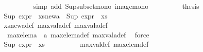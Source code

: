 \begin{isabellebody}
\ \ \ \ \ \ \ \ \isamarkupfalse%
\ {\isacharparenleft}{\kern0pt}simp\ add{\isacharcolon}{\kern0pt}\ Sup{\isacharunderscore}{\kern0pt}subset{\isacharunderscore}{\kern0pt}mono\ image{\isacharunderscore}{\kern0pt}mono{\isacharparenright}{\kern0pt}\isanewline
\ \ \ \ \ \ \isamarkupfalse%
\ \isamarkupfalse%
\ {\isacharquery}{\kern0pt}thesis\ \isamarkupfalse%
\ {\isacartoucheopen}Sup\ {\isacharparenleft}{\kern0pt}expr{\isacharunderscore}{\kern0pt}{}\ {\isacharbackquote}{\kern0pt}\ xs{\isacharunderscore}{\kern0pt}new{\isacharunderscore}{\kern0pt}a{\isacharparenright}{\kern0pt}\ {\isasymge}\ Sup\ {\isacharparenleft}{\kern0pt}expr{\isacharunderscore}{\kern0pt}{}\ {\isacharbackquote}{\kern0pt}\ xs{\isacharparenright}{\kern0pt}{\isacartoucheclose}\isanewline
\ \ \ \ \ \ \ \ \isamarkupfalse%
\ xs{\isacharunderscore}{\kern0pt}new{\isacharunderscore}{\kern0pt}a{\isacharunderscore}{\kern0pt}def\ max{\isacharunderscore}{\kern0pt}val{\isacharunderscore}{\kern0pt}a{\isacharunderscore}{\kern0pt}def\ max{\isacharunderscore}{\kern0pt}val{\isacharunderscore}{\kern0pt}a{\isacharunderscore}{\kern0pt}def\ \isanewline
\ \ \ \ \ \ \ \ \isamarkupfalse%
\ {\isachardoublequoteopen}{}{\isachardoublequoteclose}\ {\isacartoucheopen}max{\isacharunderscore}{\kern0pt}elem{\isacharunderscore}{\kern0pt}a\ {\isacharequal}{\kern0pt}\ a{\isacartoucheclose}\ max{\isacharunderscore}{\kern0pt}elem{\isacharunderscore}{\kern0pt}a{\isacharunderscore}{\kern0pt}def\ max{\isacharunderscore}{\kern0pt}val{\isacharunderscore}{\kern0pt}a{\isacharunderscore}{\kern0pt}def\ \isamarkupfalse%
\ force\isanewline
\ \ \ \ \isamarkupfalse%
\isanewline
\ \ \isamarkupfalse%
\isanewline
\ \ \ \ \isamarkupfalse%
\ {}\isanewline
\ \ \ \ \isamarkupfalse%
\ {\isachardoublequoteopen}Sup\ {\isacharparenleft}{\kern0pt}expr{\isacharunderscore}{\kern0pt}{}\ {\isacharbackquote}{\kern0pt}\ xs{\isacharparenright}{\kern0pt}\ {\isacharequal}{\kern0pt}\ {\isasyminfinity}{\isachardoublequoteclose}\isanewline
\ \ \ \ \ \ \isamarkupfalse%
\ max{\isacharunderscore}{\kern0pt}val{\isacharunderscore}{\kern0pt}def\ max{\isacharunderscore}{\kern0pt}elem{\isacharunderscore}{\kern0pt}def\isanewline
\ \ \ \ \ \ \isamarkupfalse%

\end{isabellebody}
